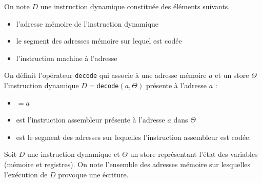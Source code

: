 \begin{defi}
On note $D$ une instruction dynamique constituée des éléments suivants.
\begin{itemize}
 \item {} l'adresse mémoire de l'instruction dynamique
 \item {} le segment des adresses mémoire sur lequel  est codée
 \item {} l'instruction machine à l'adresse 
\end{itemize}
\label{def:ensembles_inst_dyn}
\end{defi}

\begin{defi}
On définit l'opérateur \texttt{decode} qui associe à une adresse mémoire $a$ et un store $\Theta$ l'instruction dynamique $D=$\texttt{decode}$(a, \Theta)$ présente à l'adresse $a$ :
\begin{itemize}
 \item {}$=a$
 \item {} est l'instruction assembleur présente à l'adresse $a$ dans $\Theta$
 \item {} est le segment des adresses sur lequelles l'instruction assembleur est codée.
\end{itemize}
\label{def:decode}
\end{defi}

\begin{defi}
Soit $D$ une instruction dynamique et $\Theta$ un store représentant l'état des variables (mémoire et registres). On note  l'ensemble des adresses mémoire sur lesquelles l'exécution de $D$ provoque une écriture.
\label{def:ensembles_inst_dyn_write}
\end{defi}


